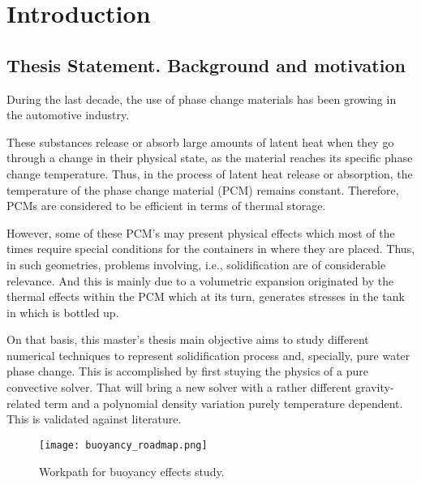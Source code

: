 
\chapter{Introduction} %

\label{Chapter1} %


\newcommand{\keyword}[1]{\textbf{#1}}
\newcommand{\tabhead}[1]{\textbf{#1}}
\newcommand{\code}[1]{\texttt{#1}}
\newcommand{\file}[1]{\texttt{\bfseries#1}}
\newcommand{\option}[1]{\texttt{\itshape#1}}
\setcounter{secnumdepth}{4}

\section{Thesis Statement. Background and motivation}

\setlength{\parindent}{0.5cm} During the last decade, the use of phase change materials has been growing in the automotive industry. 

\noindent These substances release or absorb large amounts of latent heat when they go through a change in their physical state, as the material reaches its specific phase change temperature. Thus, in the process of latent heat release or absorption, the temperature of the phase change material (PCM) remains constant. Therefore, PCMs are considered to be efficient in terms of thermal storage. 

\noindent However, some of these PCM's may present physical effects which most of the times require special conditions for the containers in where they are placed. Thus, in such geometries, problems involving, i.e., solidification are of considerable relevance. And this is mainly due to a volumetric expansion originated by the thermal effects within the PCM which at its turn, generates stresses in the tank in which is bottled up.

\noindent On that basis, this master's thesis main objective aims to study different numerical techniques to represent solidification process and, specially, pure water phase change. This is accomplished by first stuying the physics of a pure convective solver. That will bring a new solver with a rather different gravity-related term and a polynomial density variation purely temperature dependent. This is validated against literature.
\clearpage
\begin{figure}[h!]
	\centering
	\texttt{[image: buoyancy\_roadmap.png]}
	\caption{Workpath for buoyancy effects study.} 
	\label{1.1fig}
\end{figure}

